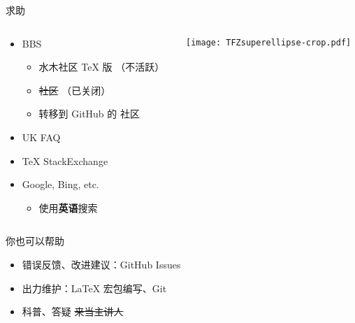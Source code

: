 \begin{frame}{求助}
  \begin{columns}[c]
    \begin{column}{.45\textwidth}
      \begin{itemize}
        \item BBS
          \begin{itemize}
            \item 水木社区 TeX 版 （不活跃）
            \item \sout{\CTeX 社区} （已关闭） 
            \item 转移到 GitHub 的 \CTeX 社区 
          \end{itemize}
        \item UK FAQ 
        \item TeX StackExchange 
        \item Google, Bing, etc.
          \begin{itemize}
            \item 使用\textbf{英语}搜索
          \end{itemize}
      \end{itemize}
    \end{column}
    \begin{column}{.45\textwidth}
      \texttt{[image: TFZsuperellipse-crop.pdf]}
    \end{column}
  \end{columns}
\end{frame}

\begin{frame}{你也可以帮助}
  \begin{itemize}
    \item 错误反馈、改进建议：GitHub Issues
    \item 出力维护：LaTeX 宏包编写、Git
    \item 科普、答疑 \hspace{2em}\sout{来当主讲人}
  \end{itemize}
\end{frame}

